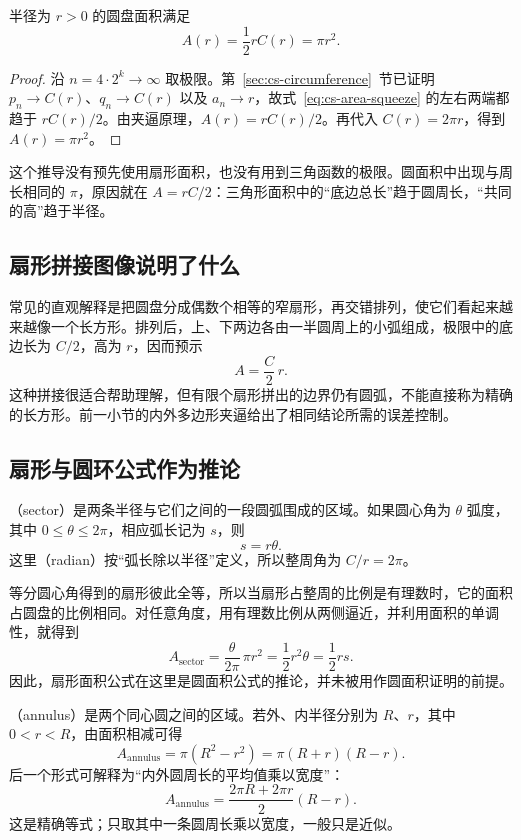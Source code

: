 \documentclass[UTF8]{ctexart}
\begin{document}
\begin{theorem}[圆盘面积]
半径为 $r>0$ 的圆盘面积满足
\begin{equation}\label{eq:cs-circle-area}
  \boxed{A(r)=\frac12rC(r)=\pi r^2}.
\end{equation}
\end{theorem}

\begin{proof}
沿 $n=4\cdot2^k\to\infty$ 取极限。第~\ref{sec:cs-circumference}~节已证明 $p_n\to C(r)$、$q_n\to C(r)$ 以及 $a_n\to r$，故式~\eqref{eq:cs-area-squeeze} 的左右两端都趋于 $rC(r)/2$。由夹逼原理，$A(r)=rC(r)/2$。再代入 $C(r)=2\pi r$，得到 $A(r)=\pi r^2$。
\end{proof}

这个推导没有预先使用扇形面积，也没有用到三角函数的极限。圆面积中出现与周长相同的 $\pi$，原因就在 $A=rC/2$：三角形面积中的“底边总长”趋于圆周长，“共同的高”趋于半径。

\subsection{扇形拼接图像说明了什么}

常见的直观解释是把圆盘分成偶数个相等的窄扇形，再交错排列，使它们看起来越来越像一个长方形。排列后，上、下两边各由一半圆周上的小弧组成，极限中的底边长为 $C/2$，高为 $r$，因而预示
\[
  A=\frac C2\,r.
\]
这种拼接很适合帮助理解，但有限个扇形拼出的边界仍有圆弧，不能直接称为精确的长方形。前一小节的内外多边形夹逼给出了相同结论所需的误差控制。

\subsection{扇形与圆环公式作为推论}

（sector）是两条半径与它们之间的一段圆弧围成的区域。如果圆心角为 $\theta$ 弧度，其中 $0\leq\theta\leq2\pi$，相应弧长记为 $s$，则
\[
  s=r\theta.
\]
这里（radian）按“弧长除以半径”定义，所以整周角为 $C/r=2\pi$。

等分圆心角得到的扇形彼此全等，所以当扇形占整周的比例是有理数时，它的面积占圆盘的比例相同。对任意角度，用有理数比例从两侧逼近，并利用面积的单调性，就得到
\begin{equation}\label{eq:cs-sector}
  A_{\mathrm{sector}}
  =\frac{\theta}{2\pi}\,\pi r^2
  =\frac12r^2\theta
  =\frac12rs.
\end{equation}
因此，扇形面积公式在这里是圆面积公式的推论，并未被用作圆面积证明的前提。

（annulus）是两个同心圆之间的区域。若外、内半径分别为 $R$、$r$，其中 $0<r<R$，由面积相减可得
\begin{equation}\label{eq:cs-annulus}
  A_{\mathrm{annulus}}=\pi(R^2-r^2)=\pi(R+r)(R-r).
\end{equation}
后一个形式可解释为“内外圆周长的平均值乘以宽度”：
\[
  A_{\mathrm{annulus}}=\frac{2\pi R+2\pi r}{2}(R-r).
\]
这是精确等式；只取其中一条圆周长乘以宽度，一般只是近似。
\end{document}
